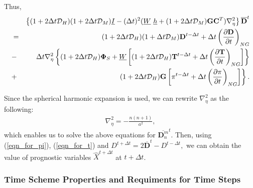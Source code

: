 Thus,
\begin{eqnarray}
      & &\left\{ ( 1+2\Delta t {\mathcal D}_H )( 1+2\Delta t {\mathcal D}_M )
           \underline{I}
      - ( \Delta t )^{2}  ( \underline{W} \ \underline{h}
           + (1+2\Delta t {\mathcal D}_M)
             {\mathbf{G}} {\mathbf{C}}^{T} ) \nabla^{2}_{\eta}
  \right\}
      \overline{ {\mathbf{D}} }^{t} \notag\\
  &=& ( 1+2\Delta t {\mathcal D}_H )( 1+\Delta t {\mathcal D}_M )
       {\mathbf{D}}^{t-\Delta t}
  + \Delta t
     \left( \frac{\partial {\mathbf{D}}}{\partial t} \right)_{NG}  \notag\\
  &-&  \Delta t \nabla^{2}_{\eta}
                   \left\{  ( 1+2\Delta t {\mathcal D}_H ) {\mathbf{\Phi}}_{S}
                          + \underline{W}
                            \left[ ( 1+2\Delta t {\mathcal D}_H )
                                    {\mathbf{T}}^{t-\Delta t}
                                  + \Delta t
                                      \left( \frac{\partial {\mathbf{T}}}
                                                  {\partial t}
                                      \right)_{NG} \right]
                   \right\} \notag \\
                 &+& \hspace{1.4cm} \left. ( 1+2\Delta t {\mathcal D}_H ) {\mathbf{G}}
                            \left[ \pi^{t-\Delta t}
                                  + \Delta t \left( \frac{\partial \pi}{\partial t}
                                  \right)_{NG}  \right]
                                  \right\}.
\end{eqnarray}

Since the spherical harmonic expansion is used, we can rewrite
\(\nabla_{\eta}^2\) as the following:
\begin{eqnarray}
\nabla_{\eta}^2=-\frac{n(n+1)}{a^2},
\end{eqnarray}
which enables us to solve the above equations for
\(\overline{ {\mathbf{D}}_n^m }^{t}\). Then, using (\ref{eqn_for_pi}),
(\ref{eqn_for_t}) and
\(D^{t+\Delta t} = 2\overline{ {\mathbf{D}} }^{t} - D^{t-\Delta t},\)
we can obtain the value of prognostic variables \(\hat{X}^{t+\Delta t}\)
at \(t+\Delta t\).

\hypertarget{time-scheme-properties-and-requiments-for-time-steps}{%
\subsubsection{Time Scheme Properties and Requiments for Time
Steps}\label{time-scheme-properties-and-requiments-for-time-steps}}

